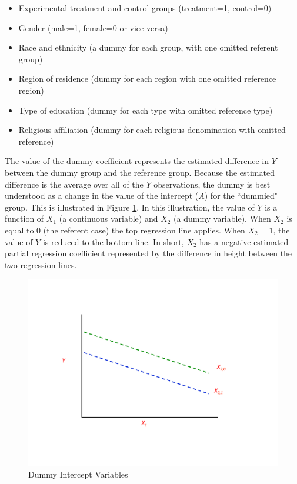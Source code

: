 \documentclass[11pt,openany]{book}\usepackage[]{graphicx}\usepackage[]{color}
\begin{document}
\begin{itemize}
\item Experimental treatment and control groups (treatment=1, control=0)
\item Gender (male=1, female=0 or vice versa)
\item Race and ethnicity (a dummy for each group, with one omitted referent group)
\item Region of residence (dummy for each region with one omitted reference region)
\item Type of education (dummy for each type with omitted reference type)
\item Religious affiliation (dummy for each religious denomination with omitted reference)
\end{itemize}

The value of the dummy coefficient represents the estimated difference in $Y$ between the dummy group and the reference group. Because the estimated difference is the average over all of the $Y$ observations, the dummy is best understood as a change in the value of the intercept ($A$) for the ``dummied" group. This is illustrated in Figure \ref{fig:dum}. In this illustration, the value of $Y$  is a function of $X_1$ (a continuous variable) and $X_2$ (a dummy variable). When $X_2$ is equal to 0 (the referent case) the top regression line applies. When $X_2 = 1$, the value of $Y$ is reduced to the bottom line. In short, $X_2$ has a negative estimated partial regression coefficient represented by the difference in height between the two regression lines.

\begin{figure}
  \centering
  \includegraphics[width=5in]{14_Topics/dummy.pdf}%
  \caption{Dummy Intercept Variables \label{fig:dum}}
\end{figure}
\end{document}
